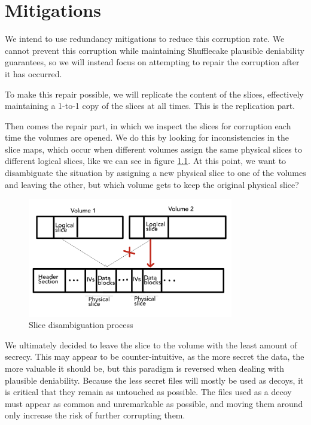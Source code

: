 \documentclass[a4paper,11pt,oneside]{report}
\begin{document}
\let\clearpage\relax

\chapter{Mitigations}

We intend to use redundancy mitigations to reduce this corruption rate. We cannot prevent this corruption while maintaining Shufflecake plausible deniability guarantees, so we will instead focus on attempting to repair the corruption after it has occurred.

To make this repair possible, we will replicate the content of the slices, effectively maintaining a 1-to-1 copy of the slices at all times. This is the replication part.

Then comes the repair part, in which we inspect the slices for corruption each time the volumes are opened. We do this by looking for inconsistencies in the slice maps, which occur when different volumes assign the same physical slices to different logical slices, like we can see in figure \ref{fig:sflc_disambiguate}. At this point, we want to disambiguate the situation by assigning a new physical slice to one of the volumes and leaving the other, but which volume gets to keep the original physical slice?

\begin{figure}[ht]
\centering
\includegraphics[width=0.8\textwidth]{Figures/slice_disambiguate.png}
\caption{Slice disambiguation process}
\label{fig:sflc_disambiguate}
\end{figure}

We ultimately decided to leave the slice to the volume with the least amount of secrecy. This may appear to be counter-intuitive, as the more secret the data, the more valuable it should be, but this paradigm is reversed when dealing with plausible deniability. Because the less secret files will mostly be used as decoys, it is critical that they remain as untouched as possible. The files used as a decoy must appear as common and unremarkable as possible, and moving them around only increase the risk of further corrupting them.
\end{document}
